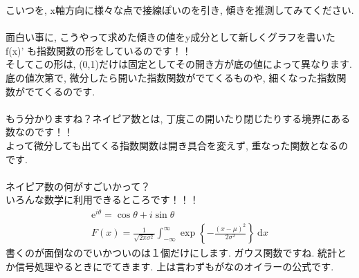 \documentclass[11pt,a4paper]{jreport}
\begin{document}
こいつを, x軸方向に様々な点で接線ぽいのを引き, 傾きを推測してみてください. \\
\\
面白い事に, こうやって求めた傾きの値をy成分として新しくグラフを書いた f(x)' も指数関数の形をしているのです！！\\
そしてこの形は, (0,1)だけは固定としてその開き方が底の値によって異なります. \\
底の値次第で, 微分したら開いた指数関数がでてくるものや, 細くなった指数関数がでてくるのです.\\
\\
もう分かりますね？ネイピア数とは, 丁度この開いたり閉じたりする境界にある数なのです！！\\
よって微分しても出てくる指数関数は開き具合を変えず, 重なった関数となるのです.\\
\\
ネイピア数の何がすごいかって？\\
いろんな数学に利用できるところです！！！\\
\begin{eqnarray}
\mathrm{e}^{i\theta} = \cos\theta + i\sin\theta \\
F(x)=\frac{1}{\sqrt{2\pi \sigma^2}}\int_{-\infty}^{\infty}\exp{\left\{-\frac{(x-\mu)^2}{2\sigma^2}\right\}}\ \mathrm{d}x
\end{eqnarray}
書くのが面倒なのでいかついのは１個だけにします. ガウス関数ですね. 統計とか信号処理やるときにでてきます. 上は言わずもがなのオイラーの公式です.\\
\end{document}
